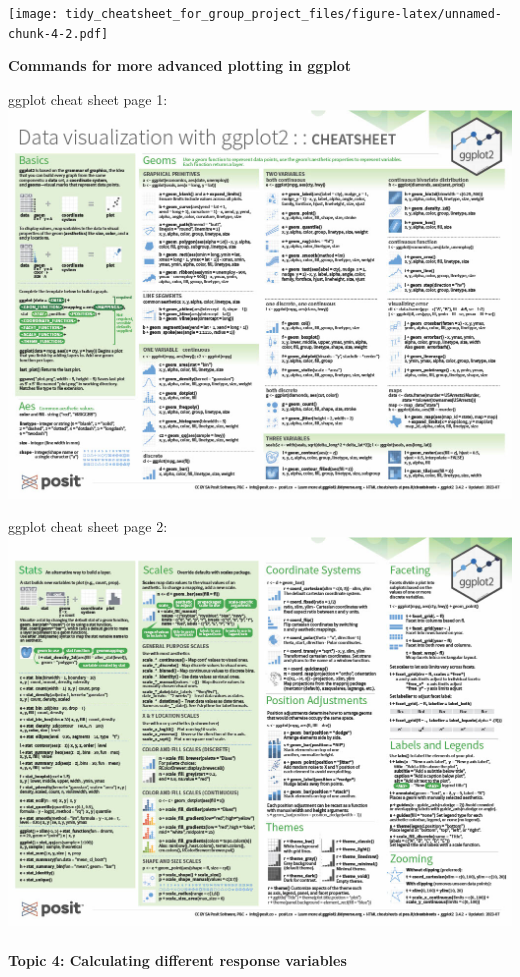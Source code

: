 \documentclass[
]{article}
\begin{document}
\texttt{[image: tidy\_cheatsheet\_for\_group\_project\_files/figure-latex/unnamed-chunk-4-2.pdf]}

\textbf{Commands for more advanced plotting in ggplot}

ggplot cheat sheet page 1: \includegraphics{page1.jpg}

ggplot cheat sheet page 2: \includegraphics{page2.jpg}

\hypertarget{topic-4-calculating-different-response-variables}{%
\paragraph{Topic 4: Calculating different response
variables}\label{topic-4-calculating-different-response-variables}}
\end{document}
